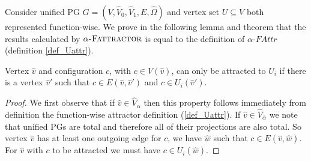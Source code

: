 Consider unified PG $G = (V,\hat{V}_0,\hat{V}_1,E,\hat{\Omega})$ and vertex set $U \subseteq V$ both represented function-wise. We prove in the following lemma and theorem that the results calculated by $\alpha\textsc{-Fattractor}$ is equal to the definition of $\alpha\textit{-FAttr}$ (definition \ref{def_Uattr}).
\begin{lemma}
\label{lem_attr_requires_E}
Vertex $\hat{v}$ and configuration $c$, with $c \in V(\hat{v})$, can only be attracted to $U_i$ if there is a vertex $\hat{v}'$ such that $c \in E(\hat{v}, \hat{v}')$ and $c \in U_i(\hat{v}')$.
	\begin{proof}
		We first observe that if $\hat{v} \in \hat{V}_\alpha$ then this property follows immediately from definition the function-wise attractor definition (\ref{def_Uattr}). If $\hat{v} \in \hat{V}_{\overline{\alpha}}$ we note that unified PGs are total and therefore all of their projections are also total. So vertex $\hat{v}$ has at least one outgoing edge for $c$, we have $\hat{w}$ such that $c \in E(\hat{v},\hat{w})$. For $\hat{v}$ with $c$ to be attracted we must have $c \in U_i(\hat{w})$.
	\end{proof}
\end{lemma}
